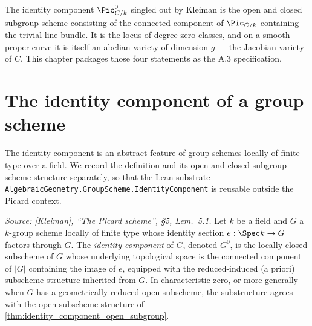 The identity component \(\Pic^0_{C/k}\) singled out by Kleiman is the open
and closed subgroup scheme consisting of the connected component of
\(\Pic_{C/k}\) containing the trivial line bundle. It is the locus of
degree-zero classes, and on a smooth proper curve it is itself an
abelian variety of dimension \(g\) --- the Jacobian variety of \(C\). This
chapter packages those four statements as the A.3 specification.

\section{The identity component of a group scheme}
\label{sec:identity_component_abstract}

The identity component is an abstract feature of group schemes locally
of finite type over a field. We record the definition and its
open-and-closed subgroup-scheme structure separately, so that the
Lean substrate
\texttt{AlgebraicGeometry.GroupScheme.IdentityComponent} is reusable
outside the Picard context.

\begin{definition}
  \label{def:identity_component_group_scheme}
  \textit{Source: [Kleiman], ``The Picard scheme'', \S 5, Lem.~5.1.}
  Let \(k\) be a field and \(G\) a \(k\)-group scheme locally of finite type
  whose identity section \(e : \Spec k \to G\) factors through \(G\). The
  \emph{identity component} of \(G\), denoted \(G^0\), is the locally closed
  subscheme of \(G\) whose underlying topological space is the connected
  component of \(|G|\) containing the image of \(e\), equipped with the
  reduced-induced (a priori) subscheme structure inherited from \(G\).
  In characteristic zero, or more generally when \(G\) has a
  geometrically reduced open subscheme, the substructure agrees with
  the open subscheme structure of \cref{thm:identity_component_open_subgroup}.
\end{definition}

